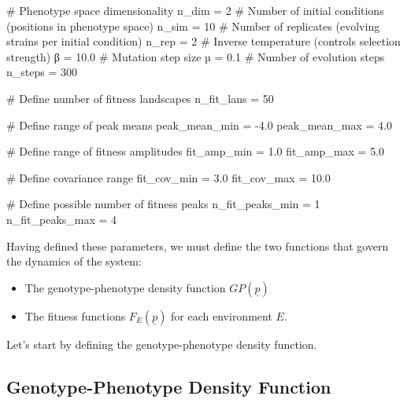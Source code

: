 \documentclass[
]{scrartcl}
\newenvironment{Shaded}{\begin{snugshade}}{\end{snugshade}}
\newcommand{\CommentTok}[1]{\textcolor[rgb]{0.37,0.37,0.37}{#1}}
\newcommand{\FloatTok}[1]{\textcolor[rgb]{0.68,0.00,0.00}{#1}}
\newcommand{\NormalTok}[1]{\textcolor[rgb]{0.00,0.23,0.31}{#1}}
\newcommand{\OperatorTok}[1]{\textcolor[rgb]{0.37,0.37,0.37}{#1}}
\providecommand{\tightlist}{%
  \setlength{\itemsep}{0pt}\setlength{\parskip}{0pt}}\usepackage{longtable,booktabs,array}
\begin{document}
\begin{Shaded}
\begin{Highlighting}[]
\CommentTok{\# Phenotype space dimensionality}
\NormalTok{n\_dim }\OperatorTok{=} \FloatTok{2}
\CommentTok{\# Number of initial conditions (positions in phenotype space)}
\NormalTok{n\_sim }\OperatorTok{=} \FloatTok{10}
\CommentTok{\# Number of replicates (evolving strains per initial condition)}
\NormalTok{n\_rep }\OperatorTok{=} \FloatTok{2}
\CommentTok{\# Inverse temperature (controls selection strength)}
\NormalTok{β }\OperatorTok{=} \FloatTok{10.0}
\CommentTok{\# Mutation step size}
\NormalTok{µ }\OperatorTok{=} \FloatTok{0.1}
\CommentTok{\# Number of evolution steps}
\NormalTok{n\_steps }\OperatorTok{=} \FloatTok{300}

\CommentTok{\# Define number of fitness landscapes}
\NormalTok{n\_fit\_lans }\OperatorTok{=} \FloatTok{50}

\CommentTok{\# Define range of peak means}
\NormalTok{peak\_mean\_min }\OperatorTok{=} \OperatorTok{{-}}\FloatTok{4.0}
\NormalTok{peak\_mean\_max }\OperatorTok{=} \FloatTok{4.0}

\CommentTok{\# Define range of fitness amplitudes}
\NormalTok{fit\_amp\_min }\OperatorTok{=} \FloatTok{1.0}
\NormalTok{fit\_amp\_max }\OperatorTok{=} \FloatTok{5.0}

\CommentTok{\# Define covariance range}
\NormalTok{fit\_cov\_min }\OperatorTok{=} \FloatTok{3.0}
\NormalTok{fit\_cov\_max }\OperatorTok{=} \FloatTok{10.0}

\CommentTok{\# Define possible number of fitness peaks}
\NormalTok{n\_fit\_peaks\_min }\OperatorTok{=} \FloatTok{1}
\NormalTok{n\_fit\_peaks\_max }\OperatorTok{=} \FloatTok{4}
\end{Highlighting}
\end{Shaded}

Having defined these parameters, we must define the two functions that
govern the dynamics of the system:

\begin{itemize}
\tightlist
\item
  The genotype-phenotype density function \(GP(\underline{p})\)
\item
  The fitness functions \(F_E(\underline{p})\) for each environment
  \(E\).
\end{itemize}

Let's start by defining the genotype-phenotype density function.

\subsection{Genotype-Phenotype Density
Function}\label{genotype-phenotype-density-function}
\end{document}
